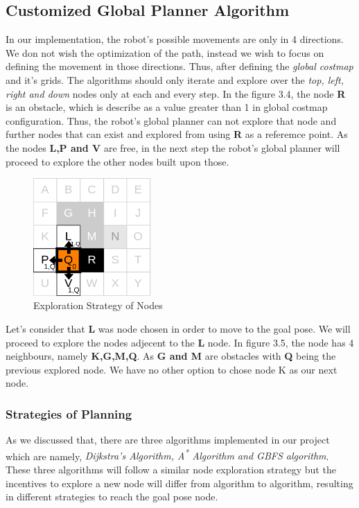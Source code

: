 \subsection{Customized Global Planner Algorithm}
In our implementation, the robot's possible movements are only in 4 directions. We don not wish the optimization of the path, instead we wish to focus
on defining the movement in those directions. Thus, after defining the \textit{global costmap} and it's grids. The algorithms should only iterate and explore
over the \textit{top, left, right and down} nodes only at each and every step.
In the figure 3.4, the node \textbf{R} is an obstacle, which is describe as a value greater than 1 in global costmap configuration.
Thus, the robot's global planner can not explore that node and further nodes that can exist and explored from using \textbf{R} as a referemce point.
As the nodes \textbf{L,P and V} are free, in the next step the robot's global planner will proceed to explore the other nodes built upon those.
\begin{figure}[th]
    \centering
    \includegraphics[width=0.4\textwidth]{Figures/grid_map_expansion_02.png}
    \decoRule
    \caption[]{Exploration Strategy of Nodes}
    \label{fig:NodeExploration4Node}
\end{figure}
Let's consider that \textbf{L} was node chosen in order to move to the goal pose. We will proceed to explore the nodes adjecent to the \textbf{L} node.
In figure 3.5, the node  has 4 neighbours, namely \textbf{K,G,M,Q}. As \textbf{G and M} are obstacles with \textbf{Q} being the previous explored node.
We have no other option to chose node K as our next node.

\subsubsection{Strategies of Planning}
As we discussed that, there are three algorithms implemented in our project which are namely, \textit{Dijkstra's Algorithm, A\textsuperscript{*} Algorithm and GBFS algorithm}.
These three algorithms will follow a similar node exploration strategy but the incentives to explore a new node will differ from algorithm to algorithm, resulting in different strategies to reach the goal pose node.

